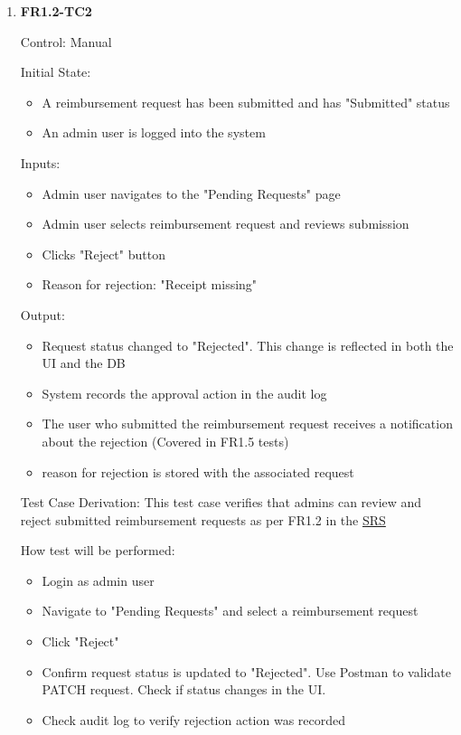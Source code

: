 \documentclass[12pt, titlepage]{article}
\begin{document}
\begin{enumerate}
    \item{\textbf{FR1.2-TC2}}
    
    Control: Manual
    
    Initial State:
    \begin{itemize}
        \item A reimbursement request has been submitted and has "Submitted" status
        \item An admin user is logged into the system
    \end{itemize}
    
    Inputs: 
    \begin{itemize}
        \item Admin user navigates to the "Pending Requests" page
        \item Admin user selects reimbursement request and reviews submission
        \item Clicks "Reject" button
        \item Reason for rejection: "Receipt missing"
    \end{itemize}
    
    Output: 
    \begin{itemize}
        \item Request status changed to "Rejected". This change is reflected in both the UI and the DB
        \item System records the approval action in the audit log
        \item The user who submitted the reimbursement request receives a notification about the rejection (Covered in FR1.5 tests)
        \item reason for rejection is stored with the associated request
    \end{itemize}
    
    Test Case Derivation: This test case verifies that admins can review and reject submitted reimbursement requests as per FR1.2 in the \href{https://shorturl.at/FdAgR}{SRS}
    
    How test will be performed:
    \begin{itemize}
        \item Login as admin user
        \item Navigate to "Pending Requests" and select a reimbursement request
        \item Click "Reject"
        \item Confirm request status is updated to "Rejected". Use Postman to validate PATCH request. Check if status changes in the UI.
        \item Check audit log to verify rejection action was recorded
    \end{itemize}
\end{enumerate}
\end{document}
